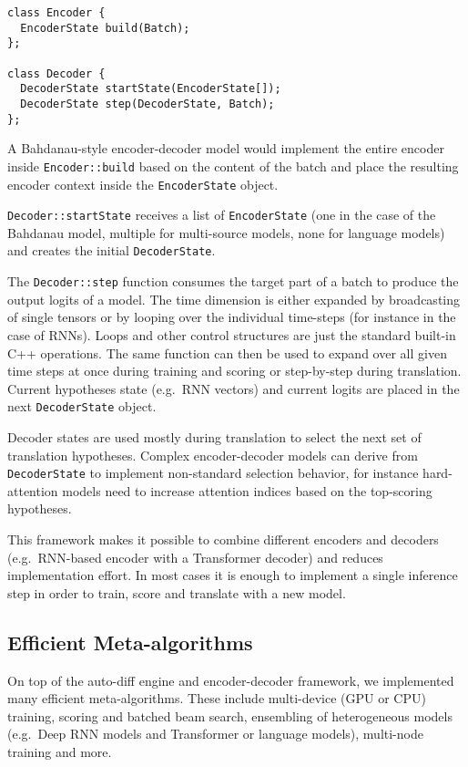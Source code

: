 \documentclass[11pt,a4paper]{article}
\begin{document}
\begin{lstlisting}
class Encoder {
  EncoderState build(Batch);
};

class Decoder {
  DecoderState startState(EncoderState[]);
  DecoderState step(DecoderState, Batch);
};
\end{lstlisting}

\noindent
A Bahdanau-style encoder-decoder model would implement the entire encoder inside \lstinline|Encoder::build| based on the content of the batch and place the resulting encoder context inside the \lstinline|EncoderState| object. 

  \lstinline|Decoder::startState| receives a list of \lstinline|EncoderState| (one in the case of the Bahdanau model, multiple for multi-source models, none for language models) and creates the initial \lstinline|DecoderState|. 

  The \lstinline|Decoder::step| function consumes the target part of a batch to produce the output logits of a model. The time dimension is either expanded by broadcasting of single tensors or by looping over the individual time-steps (for instance in the case of RNNs). 
  Loops and other control structures are just the standard built-in C++ operations. 
  The same function can then be used to expand over all given time steps at once during training and scoring or step-by-step during translation. 
  Current hypotheses state (e.g.~RNN vectors) and current logits are placed in the next \lstinline|DecoderState| object. 

  Decoder states are used mostly during translation to select the next set of translation hypotheses. Complex encoder-decoder models can derive from \lstinline|DecoderState| to implement non-standard selection behavior, for instance hard-attention models need to increase attention indices based on the top-scoring hypotheses.

  This framework makes it possible to combine different encoders and decoders (e.g.~RNN-based encoder with a Transformer decoder) and reduces implementation effort. In most cases it is enough to implement a single inference step in order to train, score and translate with a new model. 

  \subsection{Efficient Meta-algorithms}

  On top of the auto-diff engine and encoder-decoder framework, we implemented many efficient meta-algorithms. These include multi-device (GPU or CPU) training, scoring and batched beam search, ensembling of heterogeneous models (e.g.~Deep RNN models and Transformer or language models), multi-node training and more. 
\end{document}
